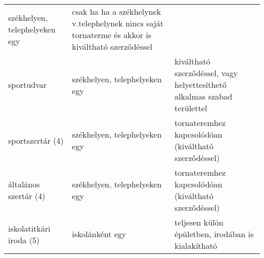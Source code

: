 \documentclass{article}
\begin{document}
\begin{longtable}[]{@{}lll@{}}
\begin{minipage}[t]{0.26\columnwidth}
székhelyen, telephelyeken egy\strut
\end{minipage} & \begin{minipage}[t]{0.51\columnwidth}\raggedright
csak ha ha a székhelynek v.telephelynek nincs saját tornaterme és akkor
is kiváltható szerződéssel\strut
\end{minipage}\tabularnewline
\begin{minipage}[t]{0.13\columnwidth}\raggedright
sportudvar\strut
\end{minipage} & \begin{minipage}[t]{0.26\columnwidth}\raggedright
székhelyen, telephelyeken egy\strut
\end{minipage} & \begin{minipage}[t]{0.51\columnwidth}\raggedright
kiváltható szerződéssel, vagy helyettesíthető alkalmas szabad
területtel\strut
\end{minipage}\tabularnewline
\begin{minipage}[t]{0.13\columnwidth}\raggedright
sportszertár (4)\strut
\end{minipage} & \begin{minipage}[t]{0.26\columnwidth}\raggedright
székhelyen, telephelyeken egy\strut
\end{minipage} & \begin{minipage}[t]{0.51\columnwidth}\raggedright
tornateremhez kapcsolódóan (kiváltható szerződéssel)\strut
\end{minipage}\tabularnewline
\begin{minipage}[t]{0.13\columnwidth}\raggedright
általános szertár (4)\strut
\end{minipage} & \begin{minipage}[t]{0.26\columnwidth}\raggedright
székhelyen, telephelyeken egy\strut
\end{minipage} & \begin{minipage}[t]{0.51\columnwidth}\raggedright
tornateremhez kapcsolódóan (kiváltható szerződéssel)\strut
\end{minipage}\tabularnewline
\begin{minipage}[t]{0.13\columnwidth}\raggedright
iskolatitkári iroda (5)\strut
\end{minipage} & \begin{minipage}[t]{0.26\columnwidth}\raggedright
iskolánként egy\strut
\end{minipage} & \begin{minipage}[t]{0.51\columnwidth}\raggedright
teljesen külön épületben, irodában is kialakítható\strut
\end{minipage}\tabularnewline

\end{longtable}
\end{document}
